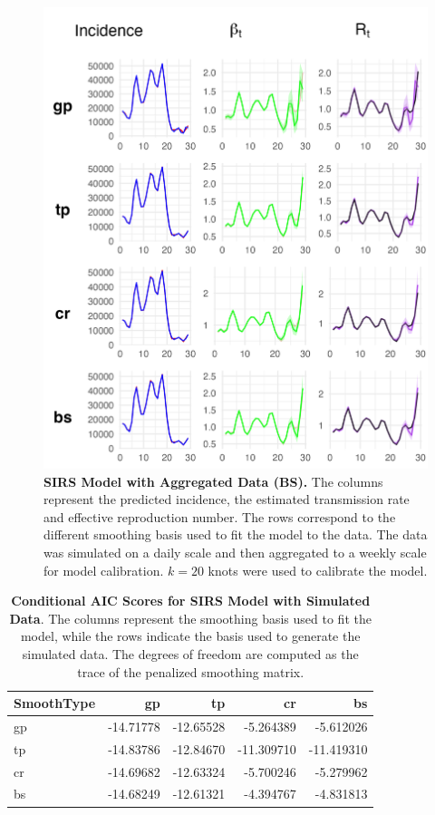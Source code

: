 \documentclass[
11pt, %
oneside, %
english, %
singlespacing, %
]{macthesis} %
\begin{document}
\begin{figure}[H]
\centering
\includegraphics[width=\textwidth]{figure/Simulated/aggregated/sim_agg_combined_bs.png}
\caption[SIRS model with aggregated data (BS).]{\textbf{SIRS Model with Aggregated Data (BS).} The columns represent the predicted incidence, the estimated transmission rate and effective reproduction number. The rows correspond to the different smoothing basis used to fit the model to the data. The data was simulated on a daily scale and then aggregated to a weekly scale for model calibration. \(k=20\) knots were used to calibrate the model.}
\label{fig:sim_agg_bs}
\end{figure}

\begin{table}[!h]
\centering
\caption{\label{tab:aic-table-sim}\textbf{Conditional AIC Scores for SIRS Model with Simulated Data}. The columns represent the smoothing basis used to fit the model, while the rows indicate the basis used to generate the simulated data. The degrees of freedom are computed as the trace of the penalized smoothing matrix.}
\centering
\begin{tabular}[t]{lrrrr}
\toprule
SmoothType & gp & tp & cr & bs\\
\midrule
gp & -14.71778 & -12.65528 & -5.264389 & -5.612026\\
tp & -14.83786 & -12.84670 & -11.309710 & -11.419310\\
cr & -14.69682 & -12.63324 & -5.700246 & -5.279962\\
bs & -14.68249 & -12.61321 & -4.394767 & -4.831813\\
\bottomrule
\end{tabular}
\end{table}
\end{document}
